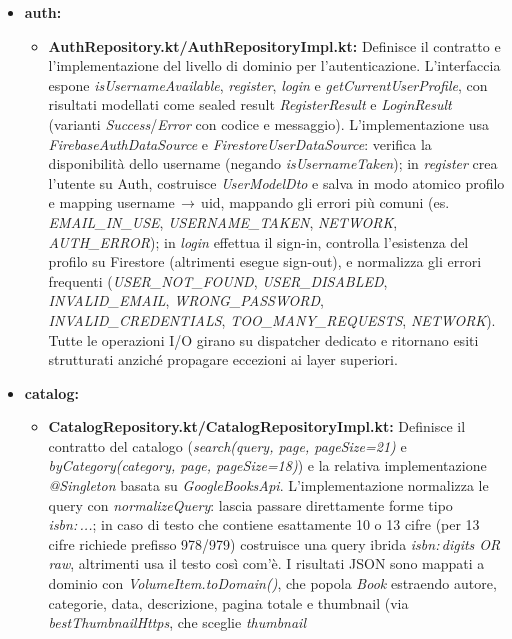 \documentclass{article}
\begin{document}
\begin{itemize}
  \item \textbf{auth:}
  \begin{itemize}
    \item \textbf{AuthRepository.kt/AuthRepositoryImpl.kt:} Definisce il contratto e l’implementazione del livello di dominio per l’autenticazione. L’interfaccia espone \textit{isUsernameAvailable}, \textit{register}, \textit{login} e \textit{getCurrentUserProfile}, 
    con risultati modellati come sealed result \textit{RegisterResult} e \textit{LoginResult} (varianti \textit{Success}/\textit{Error} con codice e messaggio). L’implementazione usa \textit{FirebaseAuthDataSource} e \textit{FirestoreUserDataSource}: 
    verifica la disponibilità dello username (negando \textit{isUsernameTaken}); in \textit{register} crea l’utente su Auth, costruisce \textit{UserModelDto} e salva in modo atomico profilo e mapping username\,$\rightarrow$\,uid, 
    mappando gli errori più comuni (es. \textit{EMAIL\_IN\_USE}, \textit{USERNAME\_TAKEN}, \textit{NETWORK}, \textit{AUTH\_ERROR}); in \textit{login} effettua il sign-in, controlla l’esistenza del profilo su Firestore (altrimenti esegue sign-out),
    e normalizza gli errori frequenti (\textit{USER\_NOT\_FOUND}, \textit{USER\_DISABLED}, \textit{INVALID\_EMAIL}, \textit{WRONG\_PASSWORD}, \textit{INVALID\_CREDENTIALS}, \textit{TOO\_MANY\_REQUESTS}, \textit{NETWORK}). 
    Tutte le operazioni I/O girano su dispatcher dedicato e ritornano esiti strutturati anziché propagare eccezioni ai layer superiori.
  \end{itemize}
  \item \textbf{catalog:}
  \begin{itemize}
    \item \textbf{CatalogRepository.kt/CatalogRepositoryImpl.kt:} Definisce il contratto del catalogo (\textit{search(query, page, pageSize=21)} e \textit{byCategory(category, page, pageSize=18)}) e la relativa implementazione \textit{@Singleton} basata su \textit{GoogleBooksApi}. 
    L’implementazione normalizza le query con \textit{normalizeQuery}: lascia passare direttamente forme tipo \textit{isbn:\,...}; in caso di testo che contiene esattamente 10 o 13 cifre (per 13 cifre richiede prefisso 978/979) costruisce una query ibrida \textit{isbn:\,digits OR raw}, 
    altrimenti usa il testo così com’è. I risultati JSON sono mappati a dominio con \textit{VolumeItem.toDomain()}, che popola \textit{Book} estraendo autore, categorie, data, descrizione, pagina totale e thumbnail (via \textit{bestThumbnailHttps}, che sceglie \textit{thumbnail} 

\end{itemize}
\end{itemize}
\end{document}
